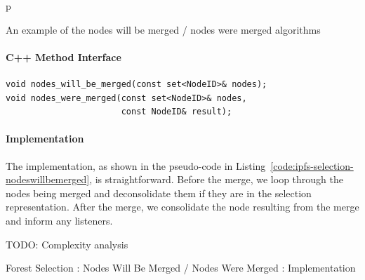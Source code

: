 \begin{stusubfig}{p}
	\hspace{4mm}%
	\hspace{4mm}%
\caption{An example of the nodes will be merged / nodes were merged algorithms}
\label{fig:ipfs-selection-nodeswillbemerged}
\end{stusubfig}

\paragraph{C++ Method Interface}

\begin{lstlisting}[style=Prototype]
void nodes_will_be_merged(const set<NodeID>& nodes);
void nodes_were_merged(const set<NodeID>& nodes,
                       const NodeID& result);
\end{lstlisting}

\paragraph{Implementation}

The implementation, as shown in the pseudo-code in Listing~\ref{code:ipfs-selection-nodeswillbemerged}, is straightforward. Before the merge, we loop through the nodes being merged and deconsolidate them if they are in the selection representation. After the merge, we consolidate the node resulting from the merge and inform any listeners.

TODO: Complexity analysis

\begin{stulisting}[p]
\caption{Forest Selection : Nodes Will Be Merged / Nodes Were Merged : Implementation}
\label{code:ipfs-selection-nodeswillbemerged}

\end{stulisting}

